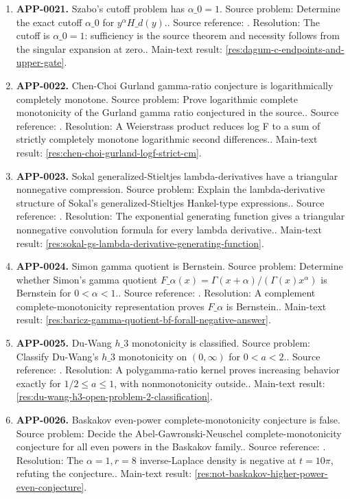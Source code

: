 \begin{enumerate}[leftmargin=*]
\item \textbf{APP-0021.} Szabo's cutoff problem has \(\alpha\_0=1\).  Source problem: Determine the exact cutoff \(\alpha\_0\) for \(y^\alpha H\_d(y)\).. Source reference: \cite{app-app-0021-source}. Resolution: The cutoff is \(\alpha\_0=1\): sufficiency is the source theorem and necessity follows from the singular expansion at zero.. Main-text result: \ref{res:dagum-c-endpoints-and-upper-gate}.
\item \textbf{APP-0022.} Chen-Choi Gurland gamma-ratio conjecture is logarithmically completely monotone.  Source problem: Prove logarithmic complete monotonicity of the Gurland gamma ratio conjectured in the source.. Source reference: \cite{app-app-0022-source}. Resolution: A Weierstrass product reduces log F to a sum of strictly completely monotone logarithmic second differences.. Main-text result: \ref{res:chen-choi-gurland-logf-strict-cm}.
\item \textbf{APP-0023.} Sokal generalized-Stieltjes lambda-derivatives have a triangular nonnegative compression.  Source problem: Explain the lambda-derivative structure of Sokal's generalized-Stieltjes Hankel-type expressions.. Source reference: \cite{app-app-0023-source}. Resolution: The exponential generating function gives a triangular nonnegative convolution formula for every lambda derivative.. Main-text result: \ref{res:sokal-gs-lambda-derivative-generating-function}.
\item \textbf{APP-0024.} Simon gamma quotient is Bernstein.  Source problem: Determine whether Simon's gamma quotient \(F\_\alpha(x)=\Gamma(x+\alpha)/(\Gamma(x)x^\alpha)\) is Bernstein for \(0<\alpha<1\).. Source reference: \cite{app-app-0024-source}. Resolution: A complement complete-monotonicity representation proves \(F\_\alpha\) is Bernstein.. Main-text result: \ref{res:baricz-gamma-quotient-bf-forall-negative-answer}.
\item \textbf{APP-0025.} Du-Wang \(h\_3\) monotonicity is classified.  Source problem: Classify Du-Wang's \(h\_3\) monotonicity on \((0,\infty)\) for \(0<a<2\).. Source reference: \cite{app-app-0025-source}. Resolution: A polygamma-ratio kernel proves increasing behavior exactly for \(1/2\le a\le1\), with nonmonotonicity outside.. Main-text result: \ref{res:du-wang-h3-open-problem-2-classification}.
\item \textbf{APP-0026.} Baskakov even-power complete-monotonicity conjecture is false.  Source problem: Decide the Abel-Gawronski-Neuschel complete-monotonicity conjecture for all even powers in the Baskakov family.. Source reference: \cite{app-app-0026-source}. Resolution: The \(\alpha=1,r=8\) inverse-Laplace density is negative at \(t=10\pi\), refuting the conjecture.. Main-text result: \ref{res:not-baskakov-higher-power-even-conjecture}.

\end{enumerate}
